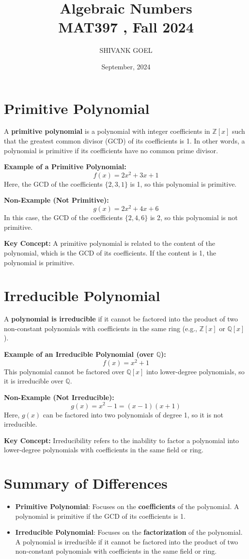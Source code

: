 \documentclass{article}
\title{Algebraic Numbers \\ MAT397 , Fall 2024} %
\date{September, 2024} %
\author{SHIVANK GOEL} %
\begin{document}
\maketitle


\section*{Primitive Polynomial}
A \textbf{primitive polynomial} is a polynomial with integer coefficients in $\mathbb{Z}[x]$ such that the greatest common divisor (GCD) of its coefficients is 1. In other words, a polynomial is primitive if its coefficients have no common prime divisor.

\textbf{Example of a Primitive Polynomial:}
\[
f(x) = 2x^2 + 3x + 1
\]
Here, the GCD of the coefficients $\{2, 3, 1\}$ is 1, so this polynomial is primitive.

\textbf{Non-Example (Not Primitive):}
\[
g(x) = 2x^2 + 4x + 6
\]
In this case, the GCD of the coefficients $\{2, 4, 6\}$ is 2, so this polynomial is not primitive.

\textbf{Key Concept:} A primitive polynomial is related to the content of the polynomial, which is the GCD of its coefficients. If the content is 1, the polynomial is primitive.

\section*{Irreducible Polynomial}
A \textbf{polynomial is irreducible} if it cannot be factored into the product of two non-constant polynomials with coefficients in the same ring (e.g., $\mathbb{Z}[x]$ or $\mathbb{Q}[x]$).

\textbf{Example of an Irreducible Polynomial (over $\mathbb{Q}$):}
\[
f(x) = x^2 + 1
\]
This polynomial cannot be factored over $\mathbb{Q}[x]$ into lower-degree polynomials, so it is irreducible over $\mathbb{Q}$.

\textbf{Non-Example (Not Irreducible):}
\[
g(x) = x^2 - 1 = (x - 1)(x + 1)
\]
Here, $g(x)$ can be factored into two polynomials of degree 1, so it is not irreducible.

\textbf{Key Concept:} Irreducibility refers to the inability to factor a polynomial into lower-degree polynomials with coefficients in the same field or ring.

\section*{Summary of Differences}
\begin{itemize}
    \item \textbf{Primitive Polynomial}: Focuses on the \textbf{coefficients} of the polynomial. A polynomial is primitive if the GCD of its coefficients is 1.
    \item \textbf{Irreducible Polynomial}: Focuses on the \textbf{factorization} of the polynomial. A polynomial is irreducible if it cannot be factored into the product of two non-constant polynomials with coefficients in the same field or ring.
\end{itemize}
\end{document}
